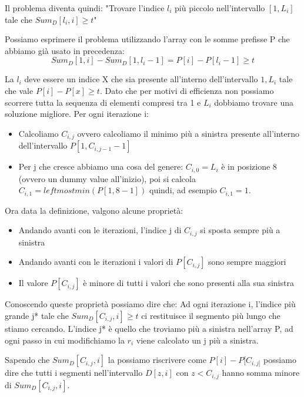 \documentclass[14pt]{extreport}
\begin{document}
Il problema diventa quindi:
\newline
"Trovare l'indice $l_i$ più piccolo nell'intervallo $[1,L_i]$ tale che $Sum_D[l_i,i] \geq t$"
\newline

Possiamo esprimere il problema utilizzando l'array con le somme prefisse P che abbiamo già usato in precedenza:
\begin{equation}
    Sum_D[1,i] - Sum_D[1, l_{i} - 1] = P[i] - P[l_i - 1] \geq t
\end{equation}

La $l_i$ deve essere un indice X che sia presente all'interno dell'intervallo $1,L_i$ tale che vale $P[i]-P[x] \geq t$.
Dato che per motivi di efficienza non possiamo scorrere tutta la sequenza di elementi compresi tra 1 e $L_i$ dobbiamo trovare una soluzione migliore.
Per ogni iterazione i:
\begin{itemize}
    \item Calcoliamo $C_{i,j}$ ovvero calcoliamo il minimo più a sinistra presente all'interno dell'intervallo $P[1,C_{i,j-1} - 1]$
    \item Per j che cresce abbiamo una cosa del genere: $C_{i,0} = L_i $ è in posizione 8 (ovvero un dummy value all'inizio), poi si calcola $C_{i,1} = leftmost min(P[1,8-1])$ quindi, ad esempio $C_{i,1} = 1 $.
\end{itemize}

Ora data la definizione, valgono alcune proprietà:
\begin{itemize}
    \item Andando avanti con le iterazioni, l'indice j di $C_{i,j}$ si sposta sempre più a sinistra
    \item Andando avanti con le iterazioni i valori di $P[C_{i,j}]$ sono sempre maggiori
    \item Il valore $P[C_{i,j}]$ è minore di tutti i valori che sono presenti alla sua sinistra
\end{itemize}

Conoscendo queste proprietà possiamo dire che:
\newline
Ad ogni iterazione i, l'indice più grande j* tale che $Sum_D[C_{i,j},i] \geq t$ ci restituisce il segmento più lungo che stiamo cercando. L'indice j* è quello che troviamo più a sinistra nell'array P, ad ogni passo in cui modifichiamo la $r_i$ viene calcolato un j più a sinistra.
\newline

Sapendo che $Sum_D[C_{i,j},i]$ la possiamo riscrivere come $P[i] - P[C_{i,j]}$ possiamo dire che tutti i segmenti nell'intervallo $D[z,i]$ con $z<C_{i,j}$ hanno somma minore di $Sum_D[C_{i,j},i]$.
\end{document}
